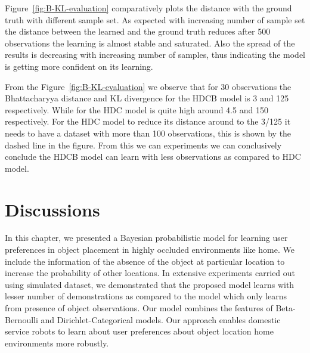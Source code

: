 Figure~\ref{fig:B-KL-evaluation} comparatively plots the distance with the ground truth with different sample set. As expected with increasing number of sample set the distance between the learned and the ground truth reduces after 500 observations the learning is almost stable and saturated. Also the spread of the results is decreasing with increasing number of samples, thus indicating the model is getting more confident on its learning. 

From the Figure~\ref{fig:B-KL-evaluation} we observe that for 30 observations the Bhattacharyya distance  and KL divergence for the HDCB model is 3 and 125 respectively. While for the HDC model is quite high around 4.5 and 150 respectively. For the HDC model to reduce its distance around to the 3/125 it needs to have a dataset with more than 100 observations, this is shown by the dashed line in the figure. From this we can experiments we can conclusively conclude the HDCB model can learn with less observations as compared to HDC model.
 

\section{Discussions}

In this chapter, we presented a Bayesian probabilistic model for learning user preferences in object placement in highly occluded environments like home. We include the information of the absence of the object at particular location to increase the probability of other locations. In extensive experiments carried out using simulated dataset, we demonstrated that the proposed model learns with lesser number of demonstrations as compared to the model which only learns from presence of object observations. Our model combines the features of Beta-Bernoulli and Dirichlet-Categorical models. Our approach enables domestic service robots to learn about user preferences about object location home environments more robustly.